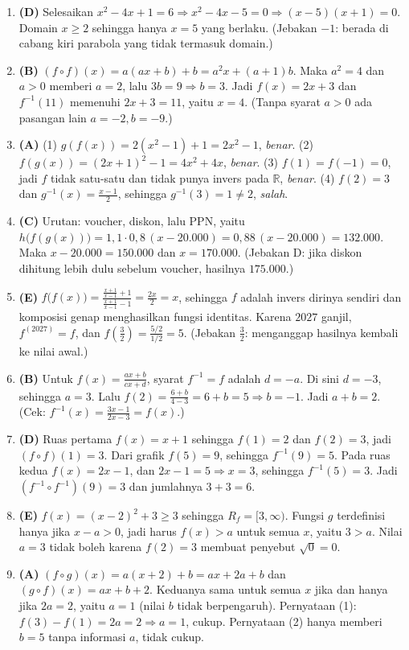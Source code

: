 \documentclass[a4paper,11pt]{article}
\newcommand{\dis}{\displaystyle}
\begin{document}
\begin{enumerate}[leftmargin=2em,itemsep=2pt,topsep=2pt]
\item[\textbf{12.}] \textbf{(D)} Selesaikan $x^2-4x+1=6\Rightarrow x^2-4x-5=0\Rightarrow(x-5)(x+1)=0$. Domain $x\ge2$ sehingga hanya $x=5$ yang berlaku. (Jebakan $-1$: berada di cabang kiri parabola yang tidak termasuk domain.)
\item[\textbf{13.}] \textbf{(B)} $(f\circ f)(x)=a(ax+b)+b=a^2x+(a+1)b$. Maka $a^2=4$ dan $a>0$ memberi $a=2$, lalu $3b=9\Rightarrow b=3$. Jadi $f(x)=2x+3$ dan $f^{-1}(11)$ memenuhi $2x+3=11$, yaitu $x=4$. (Tanpa syarat $a>0$ ada pasangan lain $a=-2,b=-9$.)
\item[\textbf{14.}] \textbf{(A)} (1) $g(f(x))=2(x^2-1)+1=2x^2-1$, \emph{benar}. (2) $f(g(x))=(2x+1)^2-1=4x^2+4x$, \emph{benar}. (3) $f(1)=f(-1)=0$, jadi $f$ tidak satu-satu dan tidak punya invers pada $\mathbb{R}$, \emph{benar}. (4) $f(2)=3$ dan $g^{-1}(x)=\dis\frac{x-1}{2}$, sehingga $g^{-1}(3)=1\neq2$, \emph{salah}.
\item[\textbf{15.}] \textbf{(C)} Urutan: voucher, diskon, lalu PPN, yaitu $h\big(f(g(x))\big)=1{,}1\cdot0{,}8\,(x-20.000)=0{,}88\,(x-20.000)=132.000$. Maka $x-20.000=150.000$ dan $x=170.000$. (Jebakan D: jika diskon dihitung lebih dulu sebelum voucher, hasilnya $175.000$.)
\item[\textbf{16.}] \textbf{(E)} $f\big(f(x)\big)=\dis\frac{\frac{x+1}{x-1}+1}{\frac{x+1}{x-1}-1}=\dis\frac{2x}{2}=x$, sehingga $f$ adalah invers dirinya sendiri dan komposisi genap menghasilkan fungsi identitas. Karena $2027$ ganjil, $f^{(2027)}=f$, dan $f\!\left(\frac32\right)=\dis\frac{5/2}{1/2}=5$. (Jebakan $\frac32$: menganggap hasilnya kembali ke nilai awal.)
\item[\textbf{17.}] \textbf{(B)} Untuk $f(x)=\dis\frac{ax+b}{cx+d}$, syarat $f^{-1}=f$ adalah $d=-a$. Di sini $d=-3$, sehingga $a=3$. Lalu $f(2)=\dis\frac{6+b}{4-3}=6+b=5\Rightarrow b=-1$. Jadi $a+b=2$. (Cek: $f^{-1}(x)=\dis\frac{3x-1}{2x-3}=f(x)$.)
\item[\textbf{18.}] \textbf{(D)} Ruas pertama $f(x)=x+1$ sehingga $f(1)=2$ dan $f(2)=3$, jadi $(f\circ f)(1)=3$. Dari grafik $f(5)=9$, sehingga $f^{-1}(9)=5$. Pada ruas kedua $f(x)=2x-1$, dan $2x-1=5\Rightarrow x=3$, sehingga $f^{-1}(5)=3$. Jadi $(f^{-1}\circ f^{-1})(9)=3$ dan jumlahnya $3+3=6$.
\item[\textbf{19.}] \textbf{(E)} $f(x)=(x-2)^2+3\ge3$ sehingga $R_f=[3,\infty)$. Fungsi $g$ terdefinisi hanya jika $x-a>0$, jadi harus $f(x)>a$ untuk semua $x$, yaitu $3>a$. Nilai $a=3$ tidak boleh karena $f(2)=3$ membuat penyebut $\sqrt{0}=0$.
\item[\textbf{20.}] \textbf{(A)} $(f\circ g)(x)=a(x+2)+b=ax+2a+b$ dan $(g\circ f)(x)=ax+b+2$. Keduanya sama untuk semua $x$ jika dan hanya jika $2a=2$, yaitu $a=1$ (nilai $b$ tidak berpengaruh). Pernyataan (1): $f(3)-f(1)=2a=2\Rightarrow a=1$, cukup. Pernyataan (2) hanya memberi $b=5$ tanpa informasi $a$, tidak cukup.
\end{enumerate}
\end{document}
